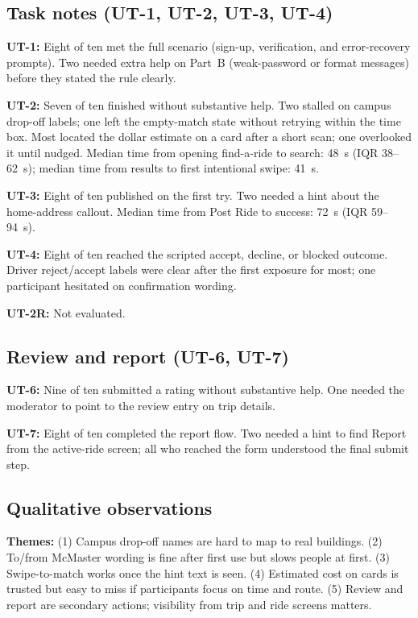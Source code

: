 \subsection{Task notes (UT-1, UT-2, UT-3, UT-4)}
\label{sec:results_trips}

\noindent\textbf{UT-1:} Eight of ten met the full scenario (sign-up, verification, and error-recovery prompts). Two needed extra help on Part~B (weak-password or format messages) before they stated the rule clearly.

\noindent\textbf{UT-2:} Seven of ten finished without substantive help. Two stalled on campus drop-off labels; one left the empty-match state without retrying within the time box. Most located the dollar estimate on a card after a short scan; one overlooked it until nudged. Median time from opening find-a-ride to search: 48~s (IQR 38--62~s); median time from results to first intentional swipe: 41~s.

\noindent\textbf{UT-3:} Eight of ten published on the first try. Two needed a hint about the home-address callout. Median time from Post Ride to success: 72~s (IQR 59--94~s).

\noindent\textbf{UT-4:} Eight of ten reached the scripted accept, decline, or blocked outcome. Driver reject/accept labels were clear after the first exposure for most; one participant hesitated on confirmation wording.

\noindent\textbf{UT-2R:} Not evaluated.

\subsection{Review and report (UT-6, UT-7)}

\noindent\textbf{UT-6:} Nine of ten submitted a rating without substantive help. One needed the moderator to point to the review entry on trip details.

\noindent\textbf{UT-7:} Eight of ten completed the report flow. Two needed a hint to find Report from the active-ride screen; all who reached the form understood the final submit step.

\subsection{Qualitative observations}

\textbf{Themes:} (1) Campus drop-off names are hard to map to real buildings. (2) To/from McMaster wording is fine after first use but slows people at first. (3) Swipe-to-match works once the hint text is seen. (4) Estimated cost on cards is trusted but easy to miss if participants focus on time and route. (5) Review and report are secondary actions; visibility from trip and ride screens matters.

